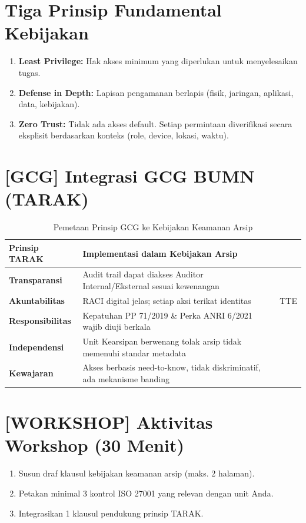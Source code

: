 \documentclass[12pt,a4paper]{report}
\begin{document}
\section{Tiga Prinsip Fundamental Kebijakan}
\begin{enumerate}[leftmargin=*]
    \item \textbf{Least Privilege:} Hak akses minimum yang diperlukan untuk menyelesaikan tugas.
    \item \textbf{Defense in Depth:} Lapisan pengamanan berlapis (fisik, jaringan, aplikasi, data, kebijakan).
    \item \textbf{Zero Trust:} Tidak ada akses default. Setiap permintaan diverifikasi secara eksplisit berdasarkan konteks (role, device, lokasi, waktu).
\end{enumerate}

\section*{[GCG] Integrasi GCG BUMN (TARAK)}
\begin{table}[htbp]
\centering
\small
\caption{Pemetaan Prinsip GCG ke Kebijakan Keamanan Arsip}
\begin{tabularx}{\textwidth}{@{} l X @{}}
\toprule
\textbf{Prinsip TARAK} & \textbf{Implementasi dalam Kebijakan Arsip} \\
\midrule
\textbf{Transparansi} & Audit trail dapat diakses Auditor Internal/Eksternal sesuai kewenangan \\
\textbf{Akuntabilitas} & RACI digital jelas; setiap aksi terikat identitas & TTE \\
\textbf{Responsibilitas} & Kepatuhan PP 71/2019 \& Perka ANRI 6/2021 wajib diuji berkala \\
\textbf{Independensi} & Unit Kearsipan berwenang tolak arsip tidak memenuhi standar metadata \\
\textbf{Kewajaran} & Akses berbasis need-to-know, tidak diskriminatif, ada mekanisme banding \\
\bottomrule
\end{tabularx}
\end{table}

\section*{[WORKSHOP] Aktivitas Workshop (30 Menit)}
\begin{enumerate}[leftmargin=*]
    \item Susun draf klausul kebijakan keamanan arsip (maks. 2 halaman).
    \item Petakan minimal 3 kontrol ISO 27001 yang relevan dengan unit Anda.
    \item Integrasikan 1 klausul pendukung prinsip TARAK.
\end{enumerate}
\end{document}
